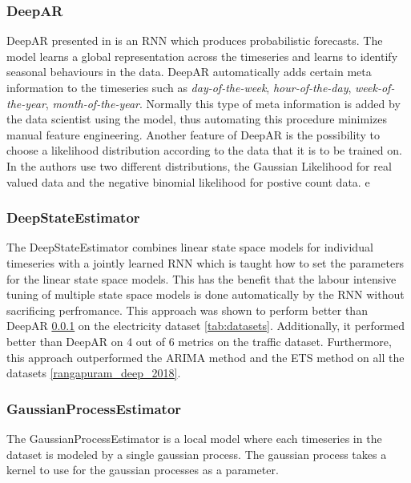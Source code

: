 \subsubsection{DeepAR}  
\label{algo:deepar}
DeepAR presented in \cite{salinas_deepar_2019} is an RNN which produces probabilistic forecasts. The model learns a global representation across the timeseries and learns to identify seasonal behaviours in the data. DeepAR automatically adds certain meta information to the timeseries such as \textit{day-of-the-week}, \textit{hour-of-the-day}, \textit{week-of-the-year}, \textit{month-of-the-year}. Normally this type of meta information is added by the data scientist using the model, thus automating this procedure minimizes manual feature engineering. Another feature of DeepAR is the possibility to choose a likelihood distribution according to the data that it is to be trained on. In \cite{salinas_deepar_2019} the authors use two different distributions, the Gaussian Likelihood for real valued data and the negative binomial likelihood for postive count data. 
e
\subsubsection{DeepStateEstimator}
The DeepStateEstimator combines linear state space models for individual timeseries with a jointly learned RNN which is taught how to set the parameters for the linear state space models. This has the benefit that the labour intensive tuning of multiple state space models is done automatically by the RNN without sacrificing perfromance. This approach was shown to perform better than DeepAR \ref{algo:deepar} on the electricity dataset \ref{tab:datasets}. Additionally, it performed better than DeepAR on 4 out of 6 metrics on the traffic dataset. Furthermore, this approach outperformed the ARIMA method and the ETS method on all the datasets \ref{rangapuram_deep_2018}. 

\subsubsection{GaussianProcessEstimator}
The GaussianProcessEstimator is a local model where each timeseries in the dataset is modeled by a single gaussian process. The gaussian process takes a kernel to use for the gaussian processes as a parameter. 
\cite{gluonts-website}

